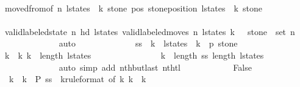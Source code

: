\begin{isabellebody}
\ \ \ \ \ \ \ \ \ \ \ \ \isamarkupfalse%
\ moved{\isacharunderscore}from{\isacharbrackleft}of\ n\ l{\isacharunderscore}states\ {}\ k\ stone{\isacharbrackright}\ pos{}\ {\isacharbackquoteopen}stone{\isacharunderscore}position\ {\isacharparenleft}l{\isacharunderscore}states\ {\isacharbang}\ k{\isacharparenright}\ stone\ {\isasymnoteq}\ {}{\isacharbackquoteclose}\isanewline
\ \ \ \ \ \ \ \ \ \ \ \ \isamarkupfalse%
\ {\isacharbackquoteopen}valid{\isacharunderscore}labeled{\isacharunderscore}state\ n\ {\isacharparenleft}hd\ l{\isacharunderscore}states{\isacharparenright}{\isacharbackquoteclose}\ {\isacharbackquoteopen}valid{\isacharunderscore}labeled{\isacharunderscore}moves\ n\ l{\isacharunderscore}states{\isacharbackquoteclose}\ {\isacharbackquoteopen}k\ {\isachargreater}\ {}{\isacharbackquoteclose}\ {\isacharbackquoteopen}stone\ {\isasymin}\ set\ {\isacharbrackleft}{}{\isachardot}{\isachardot}{\isacharless}n{\isacharbrackright}{\isacharbackquoteclose}\isanewline
\ \ \ \ \ \ \ \ \ \ \ \ \isamarkupfalse%
\ auto\isanewline
\ \ \ \ \ \ \ \ \ \ \isamarkupfalse%
\ \isamarkupfalse%
\ {\isachardoublequoteopen}{\isacharquery}ss\ {\isacharbang}\ k{\isacharprime}\ {\isacharequal}\ {\isacharparenleft}l{\isacharunderscore}states\ {\isacharbang}\ k{\isacharprime}{\isacharcomma}\ {}{\isacharcomma}\ p{}{\isacharprime}{\isacharprime}{\isacharcomma}\ stone{\isacharparenright}{\isachardoublequoteclose}\isanewline
\ \ \ \ \ \ \ \ \ \ \ \ \isamarkupfalse%
\ {\isacharbackquoteopen}k{\isacharprime}\ {\isacharless}\ k{\isacharbackquoteclose}\ {\isacharbackquoteopen}k\ {\isacharless}\ length\ l{\isacharunderscore}states\ {\isacharminus}\ {}{\isacharbackquoteclose}\isanewline
\ \ \ \ \ \ \ \ \ \ \ \ \isamarkupfalse%
\ {\isacharbackquoteopen}k\ {\isacharless}\ length\ {\isacharquery}ss{\isacharbackquoteclose}\ {\isacharbackquoteopen}length\ l{\isacharunderscore}states\ {\isasymge}\ {}{\isacharbackquoteclose}\isanewline
\ \ \ \ \ \ \ \ \ \ \ \ \isamarkupfalse%
\ {\isacharparenleft}auto\ simp\ add{\isacharcolon}\ nth{\isacharunderscore}butlast\ nth{\isacharunderscore}tl{\isacharparenright}\isanewline
\ \ \ \ \ \ \ \ \ \ \isamarkupfalse%
\ False\isanewline
\ \ \ \ \ \ \ \ \ \ \ \ \isamarkupfalse%
\ {\isacharbackquoteopen}{\isasymforall}\ k{\isacharprime}\ {\isacharless}\ k{\isachardot}\ {\isasymnot}\ {\isacharquery}P\ {\isacharparenleft}{\isacharquery}ss\ {\isacharbang}\ k{\isacharprime}{\isacharparenright}{\isacharbackquoteclose}{\isacharbrackleft}rule{\isacharunderscore}format{\isacharcomma}\ of\ k{\isacharprime}{\isacharbrackright}\ {\isacharbackquoteopen}k{\isacharprime}\ {\isacharless}\ k{\isacharbackquoteclose}\isanewline

\end{isabellebody}
